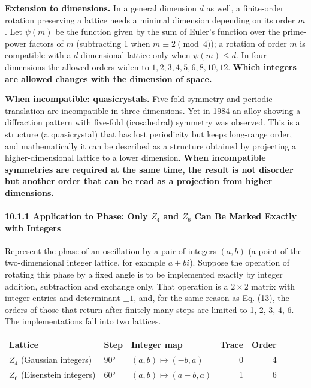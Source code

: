 \documentclass[
  a4paper,
]{article}
\newcounter{none} %
\begin{document}
\textbf{Extension to dimensions.} In a general dimension \(d\) as well,
a finite-order rotation preserving a lattice needs a minimal dimension
depending on its order \(m\). Let \(\psi(m)\) be the function given by
the sum of Euler's function over the prime-power factors of \(m\)
(subtracting 1 when \(m\equiv2\pmod 4\)); a rotation of order \(m\) is
compatible with a \(d\)-dimensional lattice only when \(\psi(m)\le d\).
In four dimensions the allowed orders widen to \(1,2,3,4,5,6,8,10,12\).
\textbf{Which integers are allowed changes with the dimension of space.}

\textbf{When incompatible: quasicrystals.} Five-fold symmetry and
periodic translation are incompatible in three dimensions. Yet in 1984
an alloy showing a diffraction pattern with five-fold (icosahedral)
symmetry was observed. This is a structure (a quasicrystal) that has
lost periodicity but keeps long-range order, and mathematically it can
be described as a structure obtained by projecting a higher-dimensional
lattice to a lower dimension. \textbf{When incompatible symmetries are
required at the same time, the result is not disorder but another order
that can be read as a projection from higher dimensions.}

\paragraph{\texorpdfstring{10.1.1 Application to Phase: Only \(Z_4\) and
\(Z_6\) Can Be Marked Exactly with
Integers}{10.1.1 Application to Phase: Only Z\_4 and Z\_6 Can Be Marked Exactly with Integers}}\label{application-to-phase-only-z_4-and-z_6-can-be-marked-exactly-with-integers}

Represent the phase of an oscillation by a pair of integers \((a,b)\) (a
point of the two-dimensional integer lattice, for example \(a+bi\)).
Suppose the operation of rotating this phase by a fixed angle is to be
implemented exactly by integer addition, subtraction and exchange only.
That operation is a \(2\times2\) matrix with integer entries and
determinant \(\pm1\), and, for the same reason as Eq. (13), the orders
of those that return after finitely many steps are limited to 1, 2, 3,
4, 6. The implementations fall into two lattices.

{\def\LTcaptype{none} %
\begin{longtable}[]{@{}lllrr@{}}
\toprule\noalign{}
Lattice & Step & Integer map & Trace & Order \\
\midrule\noalign{}
\endhead
\bottomrule\noalign{}
\endlastfoot
\(Z_4\) (Gaussian integers) & 90° & \((a,b)\mapsto(-b,a)\) & 0 & 4 \\
\(Z_6\) (Eisenstein integers) & 60° & \((a,b)\mapsto(a-b,a)\) & 1 & 6 \\
\end{longtable}
}
\end{document}
